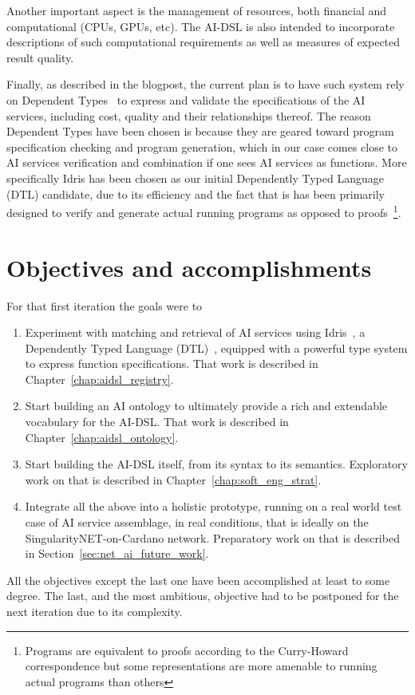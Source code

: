 \documentclass[]{report}
\begin{document}
Another important aspect is the management of resources, both
financial and computational (CPUs, GPUs, etc).  The AI-DSL is also
intended to incorporate descriptions of such computational
requirements as well as measures of expected result quality.

Finally, as described in the blogpost, the current plan is to have
such system rely on Dependent Types~\cite{Altenkirch05whydependent} to
express and validate the specifications of the AI services, including
cost, quality and their relationships thereof.  The reason Dependent
Types have been chosen is because they are geared toward program
specification checking and program generation, which in our case comes
close to AI services verification and combination if one sees AI
services as functions.  More specifically Idris has been chosen as our
initial Dependently Typed Language (DTL) candidate, due to its
efficiency and the fact that is has been primarily designed to verify
and generate actual running programs as opposed to
proofs~\footnote{Programs are equivalent to proofs according to the
Curry-Howard correspondence but some representations are more amenable
to running actual programs than others}.

\section{Objectives and accomplishments}
For that first iteration the goals were to
\begin{enumerate}
\item Experiment with matching and retrieval of AI services using
  Idris~\cite{Idris}, a Dependently Typed Language (DTL)~\cite{DTL},
  equipped with a powerful type system to express function
  specifications.  That work is described in
  Chapter~\ref{chap:aidsl_registry}.
\item Start building an AI ontology to ultimately provide a rich and
  extendable vocabulary for the AI-DSL.  That work is described in
  Chapter~\ref{chap:aidsl_ontology}.
\item Start building the AI-DSL itself, from its syntax to its
  semantics.  Exploratory work on that is described in
  Chapter~\ref{chap:soft_eng_strat}.
\item Integrate all the above into a holistic prototype, running on a
  real world test case of AI service assemblage, in real conditions,
  that is ideally on the SingularityNET-on-Cardano network.
  Preparatory work on that is described in
  Section~\ref{sec:net_ai_future_work}.
\end{enumerate}
All the objectives except the last one have been accomplished at
least to some degree.  The last, and the most ambitious, objective had
to be postponed for the next iteration due to its complexity.
\end{document}
